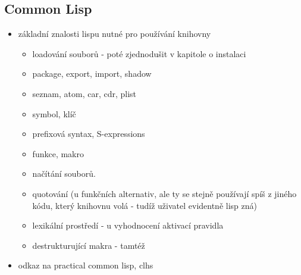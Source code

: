 \subsection{Common Lisp}
\begin{framed}
\begin{itemize}
  \item základní znalosti lispu nutné pro používání knihovny
  \begin{itemize}
    \item loadování souborů - poté zjednodušit v kapitole o instalaci
    \item package, export, import, shadow
    \item seznam, atom, car, cdr, plist
    \item symbol, klíč
    \item prefixová syntax, S-expressions
    \item funkce, makro
    \item načítání souborů.
    \item quotování (u funkčních alternativ, ale ty se stejně používají spíš z jiného
      kódu, který knihovnu volá - tudíž uživatel evidentně lisp zná)
    \item lexikální prostředí - u vyhodnocení aktivací pravidla
    \item destrukturující makra - tamtéž
  \end{itemize}
  \item odkaz na practical common lisp, clhs
\end{itemize}
\end{framed}
